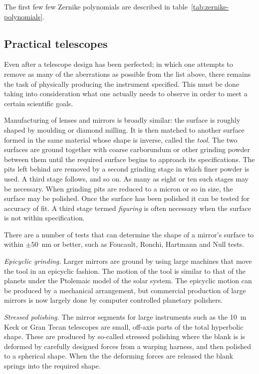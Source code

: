\documentclass{article}
\begin{document}
The first few few Zernike polynomials are described in table~\ref{tab:zernike-polynomials}.

\subsection{Practical telescopes}

Even after a telescope design has been perfected; in which one attempts to 
remove as many of the aberrations as possible from the list above, there 
remains the task of physically producing the instrument specified. This must
be done taking into consideration what one actually needs to observe in 
order to meet a certain scientific goals. 

Manufacturing of lenses and mirrors is broadly similar: the surface is roughly
shaped by moulding or diamond milling. It is then matched to another surface
formed in the same material whose shape is inverse, called the {\it tool}. 
The two surfaces are ground together with coarse carborundum or other grinding
powder between them until the required surface begins to approach 
its specifications. The pits left behind are removed by a second grinding stage
in which finer powder is used. A third stage follows, and so on. As many as
eight or ten such stages may be necessary. When grinding pits are reduced to
a micron or so in size, the surface may be polished. Once the surface has been
polished it can be tested for accuracy of fit. A third stage termed {\it 
figuring} is often necessary when the surface is not within specification. 

There are a number of tests that can determine the shape of a mirror's surface
to within $\pm 50$~nm or better, such as Foucault, Ronchi, Hartmann and Null
tests. 

\noindent
{\it Epicyclic grinding.} Larger mirrors are ground by using large machines that 
move the tool in an epicyclic fashion. The motion of the tool is similar to that of 
the planets under the Ptolemaic model of the solar system. The epicyclic motion 
can be produced by a mechanical arrangement, but commercial production of 
large mirrors is now largely done by computer controlled planetary polishers. 

\noindent
{\it Stressed polishing.} The mirror segments for large instruments such as the 10~m
Keck or Gran Tecan telescopes are small, off-axis parts of the total hyperbolic shape. 
These are produced by so-called stressed polishing where the blank is is deformed 
by carefully designed forces from a warping harness, and then polished to a spherical
shape. When the the deforming forces are released the blank springs into the required 
shape.
\end{document}
